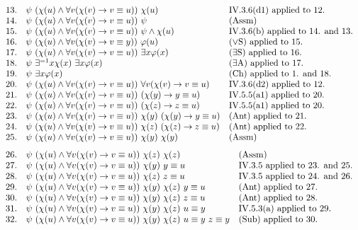 \documentclass[leqno]{report}
\newcommand{\assm}{{(\mathrm{Assm})}}
\newcommand{\ant}{{(\mathrm{Ant})}}
\newcommand{\ors}{{(\lor\mathrm{S})}}
\newcommand{\ea}{{(\exists\mathrm{A})}}
\newcommand{\es}{{(\exists\mathrm{S})}}
\newcommand{\sub}{{(\mathrm{Sub})}}
\begin{document}
\begin{enumerate}[1.]
\[\begin{array}{rll}
13. & \psi \ (\chi(u) \land \forall v (\chi(v) \rightarrow v \equiv u)) \ \chi(u) & \mbox{IV.3.6(d1) applied to 12.} \cr
14. & \psi \ (\chi(u) \land \forall v (\chi(v) \rightarrow v \equiv u)) \ \psi & \mbox{$\assm$} \cr
15. & \psi \ (\chi(u) \land \forall v (\chi(v) \rightarrow v \equiv u)) \ \psi \land \chi(u) & \mbox{IV.3.6(b) applied to 14. and 13.} \cr
16. & \psi \ (\chi(u) \land \forall v (\chi(v) \rightarrow v \equiv y)) \ \varphi(u) & \mbox{$\ors$ applied to 15.} \cr
17. & \psi \ (\chi(u) \land \forall v (\chi(v) \rightarrow v \equiv u)) \ \exists x \varphi(x) & \mbox{$\es$ applied to 16.} \cr
18. & \psi \ \exists^{=1} x \chi(x) \ \exists x \varphi(x) & \mbox{$\ea$ applied to 17.} \cr
19. & \psi \ \exists x \varphi(x) & \mbox{(Ch) applied to 1. and 18.} \cr
20. & \psi \ (\chi(u) \land \forall v (\chi(v) \rightarrow v \equiv u)) \ \forall v (\chi(v) \rightarrow v \equiv u) & \mbox{IV.3.6(d2) applied to 12.} \cr
21. & \psi \ (\chi(u) \land \forall v (\chi(v) \rightarrow v \equiv u)) \ (\chi(y) \rightarrow y \equiv u) & \mbox{IV.5.5(a1) applied to 20.} \cr
22. & \psi \ (\chi(u) \land \forall v (\chi(v) \rightarrow v \equiv u)) \ (\chi(z) \rightarrow z \equiv u) & \mbox{IV.5.5(a1) applied to 20.} \cr
23. & \psi \ (\chi(u) \land \forall v (\chi(v) \rightarrow v \equiv u)) \ \chi(y) \ (\chi(y) \rightarrow y \equiv u) & \mbox{$\ant$ applied to 21.} \cr
24. & \psi \ (\chi(u) \land \forall v (\chi(v) \rightarrow v \equiv u)) \ \chi(z) \ (\chi(z) \rightarrow z \equiv u) & \mbox{$\ant$ applied to 22.} \cr
25. & \psi \ (\chi(u) \land \forall v (\chi(v) \rightarrow v \equiv u)) \ \chi(y) \ \chi(y) & \mbox{$\assm$} \cr
\end{array}
\]
\[
\begin{array}{rll}
26. & \psi \ (\chi(u) \land \forall v (\chi(v) \rightarrow v \equiv u)) \ \chi(z) \ \chi(z) & \mbox{$\assm$} \cr
27. & \psi \ (\chi(u) \land \forall v (\chi(v) \rightarrow v \equiv u)) \ \chi(y) \ y \equiv u & \mbox{IV.3.5 applied to 23. and 25.} \cr
28. & \psi \ (\chi(u) \land \forall v (\chi(v) \rightarrow v \equiv u)) \ \chi(z) \ z \equiv u & \mbox{IV.3.5 applied to 24. and 26.} \cr
29. & \psi \ (\chi(u) \land \forall v (\chi(v) \rightarrow v \equiv u)) \ \chi(y) \ \chi(z) \ y \equiv u & \mbox{$\ant$ applied to 27.} \cr
30. & \psi \ (\chi(u) \land \forall v (\chi(v) \rightarrow v \equiv u)) \ \chi(y) \ \chi(z) \ z \equiv u & \mbox{$\ant$ applied to 28.} \cr
31. & \psi \ (\chi(u) \land \forall v (\chi(v) \rightarrow v \equiv u)) \ \chi(y) \ \chi(z) \ u \equiv y & \mbox{IV.5.3(a) applied to 29.} \cr
32. & \psi \ (\chi(u) \land \forall v (\chi(v) \rightarrow v \equiv u)) \ \chi(y) \ \chi(z) \ u \equiv y \ z \equiv y & \mbox{$\sub$ applied to 30.} \cr

\end{array}\]
\end{enumerate}
\end{document}
